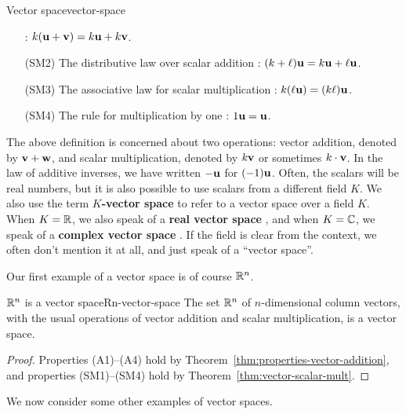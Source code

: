 \begin{definition}{Vector space}{vector-space}
\begin{itemize}
    :
    $k(\mbox{\bf u} + \mbox{\bf v}) = k\mbox{\bf u} + k\mbox{\bf v}$.
  \item[(SM2)] The distributive law over scalar addition%
    :
    $(k + \ell) \mbox{\bf u} = k \mbox{\bf u} + \ell\mbox{\bf u}$.
  \item[(SM3)] The associative law for scalar multiplication%
    :
    $k(\ell\mbox{\bf u}) = (k \ell)\mbox{\bf u}$.
  \item[(SM4)] The rule for multiplication by one%
    :
    $1\mbox{\bf u}=\mbox{\bf u}$.
  \end{itemize}
\end{definition}

The above definition is concerned about two operations: vector
addition, denoted by $\mbox{\bf v} + \mbox{\bf w}$, and scalar multiplication,
denoted by $k\mbox{\bf v}$ or sometimes $k\cdot\mbox{\bf v}$. In the law of
additive inverses, we have written $-\mbox{\bf u}$ for $(-1)\mbox{\bf u}$.
Often, the scalars will be real numbers, but it is also possible to
use scalars from a different field $K$. We also use the term
\textbf{$K$-vector space}%
 to refer to a vector space over a field $K$.
When $K=\mathbb{R}$, we also speak of a \textbf{real vector space}%
%
, and when $K=\mathbb{C}$, we speak of a
\textbf{complex vector space}%
%
. If the field is clear from the context,
we often don't mention it at all, and just speak of a ``vector
space''.

Our first example of a vector space is of course $\mathbb{R}^n$.

\begin{example}{$\mathbb{R}^n$ is a vector space}{Rn-vector-space}
  The set $\mathbb{R}^n$ of $n$-dimensional column vectors, with the usual
  operations of vector addition and scalar multiplication, is a vector
  space.
\end{example}

\begin{proof}
  Properties (A1)--(A4) hold by
  Theorem~\ref{thm:properties-vector-addition}, and properties
  (SM1)--(SM4) hold by Theorem~\ref{thm:vector-scalar-mult}.
\end{proof}

We now consider some other examples of vector spaces.

